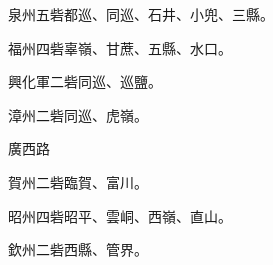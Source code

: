 \begin{pinyinscope}
 泉州五砦都巡、同巡、石井、小兜、三縣。



 福州四砦辜嶺、甘蔗、五縣、水口。



 興化軍二砦同巡、巡鹽。



 漳州二砦同巡、虎嶺。



 廣西路



 賀州二砦臨賀、富川。



 昭州四砦昭平、雲峒、西嶺、直山。



 欽州二砦西縣、管界。



\end{pinyinscope}